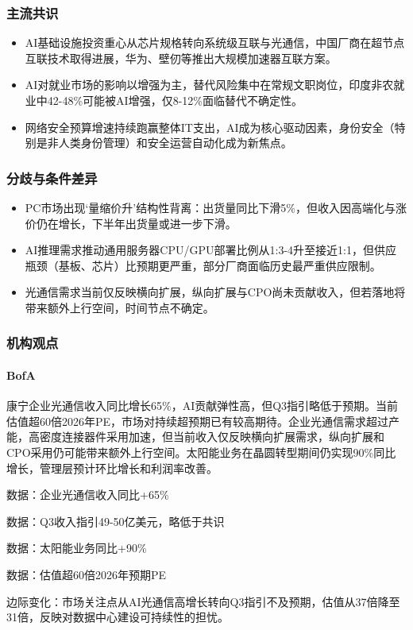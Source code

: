 \documentclass[11pt]{ctexart}
\begin{document}
\subsubsection*{主流共识}
\begin{itemize}
  \item AI基础设施投资重心从芯片规格转向系统级互联与光通信，中国厂商在超节点互联技术取得进展，华为、壁仞等推出大规模加速器互联方案。
  \item AI对就业市场的影响以增强为主，替代风险集中在常规文职岗位，印度非农就业中42-48\%可能被AI增强，仅8-12\%面临替代不确定性。
  \item 网络安全预算增速持续跑赢整体IT支出，AI成为核心驱动因素，身份安全（特别是非人类身份管理）和安全运营自动化成为新焦点。
\end{itemize}
\subsubsection*{分歧与条件差异}
\begin{itemize}
  \item PC市场出现‘量缩价升’结构性背离：出货量同比下滑5\%，但收入因高端化与涨价仍在增长，下半年出货量或进一步下滑。
  \item AI推理需求推动通用服务器CPU/GPU部署比例从1:3-4升至接近1:1，但供应瓶颈（基板、芯片）比预期更严重，部分厂商面临历史最严重供应限制。
  \item 光通信需求当前仅反映横向扩展，纵向扩展与CPO尚未贡献收入，但若落地将带来额外上行空间，时间节点不确定。
\end{itemize}
\subsubsection*{机构观点}
\paragraph{BofA} 康宁企业光通信收入同比增长65\%，AI贡献弹性高，但Q3指引略低于预期。当前估值超60倍2026年PE，市场对持续超预期已有较高期待。企业光通信需求超过产能，高密度连接器件采用加速，但当前收入仅反映横向扩展需求，纵向扩展和CPO采用仍可能带来额外上行空间。太阳能业务在晶圆转型期间仍实现90\%同比增长，管理层预计环比增长和利润率改善。
{\small\color{refgray}数据：企业光通信收入同比+65\%\par}
{\small\color{refgray}数据：Q3收入指引49-50亿美元，略低于共识\par}
{\small\color{refgray}数据：太阳能业务同比+90\%\par}
{\small\color{refgray}数据：估值超60倍2026年预期PE\par}
{\small\color{refgray}边际变化：市场关注点从AI光通信高增长转向Q3指引不及预期，估值从37倍降至31倍，反映对数据中心建设可持续性的担忧。\par}
\end{document}
